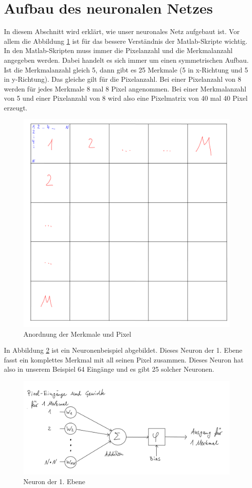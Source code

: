\newpage
\section{Aufbau des neuronalen Netzes}

In diesem Abschnitt wird erklärt, wie unser neuronales Netz aufgebaut ist. Vor allem die Abbildung \ref{AnordungMerkuPix} ist für das bessere Verständnis der Matlab-Skripte wichtig. In den Matlab-Skripten muss immer die Pixelanzahl und die Merkmalanzahl angegeben werden. Dabei handelt es sich immer um einen symmetrischen Aufbau. Ist die Merkmalanzahl gleich 5, dann gibt es 25 Merkmale (5 in x-Richtung und 5 in y-Richtung). Das gleiche gilt für die Pixelanzahl. Bei einer Pixelanzahl von 8 werden für jedes Merkmale 8 mal 8 Pixel angenommen. Bei einer Merkmalanzahl von 5 und einer Pixelanzahl von 8 wird also eine Pixelmatrix von 40 mal 40 Pixel erzeugt.

\begin{figure}[hbt]
	\centering
	\includegraphics[width=0.5\linewidth]{./Bilder/Auswertung/Aufbau/page4}
	\caption{Anordnung der Merkmale und Pixel}
	\label{AnordungMerkuPix}
\end{figure}

In Abbildung \ref{Neuron1Ebene} ist ein Neuronenbeispiel abgebildet. Dieses Neuron der 1. Ebene fasst ein komplettes Merkmal mit all seinen Pixel zusammen. Dieses Neuron hat also in unserem Beispiel 64 Eingänge und es gibt 25 solcher Neuronen.

\begin{figure}[hbt]
	\centering
	\includegraphics[width=0.6\linewidth]{./Bilder/Auswertung/Aufbau/page5}
	\caption{Neuron der 1. Ebene}
	\label{Neuron1Ebene}
\end{figure}

